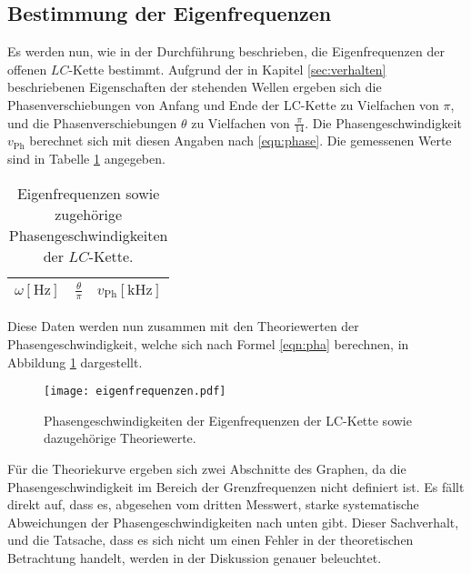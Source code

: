\subsection{Bestimmung der Eigenfrequenzen}
Es werden nun, wie in der Durchführung beschrieben, die Eigenfrequenzen der offenen $LC$-Kette bestimmt.
Aufgrund der in Kapitel \ref{sec:verhalten} beschriebenen Eigenschaften der stehenden Wellen ergeben sich die Phasenverschiebungen von Anfang und Ende der LC-Kette zu Vielfachen von $\pi$, und die Phasenverschiebungen $\theta$ zu Vielfachen von $\frac{\pi}{14}$.
Die Phasengeschwindigkeit $v_{\text{Ph}}$ berechnet sich mit diesen Angaben nach \eqref{eqn:phase}.
Die gemessenen Werte sind in Tabelle \ref{tab:eigenfrequenzen} angegeben.
\begin{table}
  \centering
  \caption{Eigenfrequenzen sowie zugehörige Phasengeschwindigkeiten der $LC$-Kette.}
  \label{tab:eigenfrequenzen}
  \begin{tabular}{c c c}
    \toprule
    {$\omega [\si{\hertz}]$} & {$\frac{\theta}{\pi} $} & {$v_{\text{Ph}} [\si{\kilo\hertz}] $}\\
    \midrule
    
    \bottomrule
  \end{tabular}
\end{table}
Diese Daten werden nun zusammen mit den Theoriewerten der Phasengeschwindigkeit, welche sich nach Formel \eqref{eqn:pha} berechnen, in Abbildung \ref{fig:phasengeschwindigkeiten} dargestellt.
\begin{figure}[H]
  \centering
  \texttt{[image: eigenfrequenzen.pdf]}
  \caption{Phasengeschwindigkeiten der Eigenfrequenzen der LC-Kette sowie dazugehörige Theoriewerte.}
  \label{fig:phasengeschwindigkeiten}
\end{figure}
Für die Theoriekurve ergeben sich zwei Abschnitte des Graphen, da die Phasengeschwindigkeit im Bereich der Grenzfrequenzen nicht definiert ist.
Es fällt direkt auf, dass es, abgesehen vom dritten Messwert, starke systematische Abweichungen der Phasengeschwindigkeiten nach unten gibt.
Dieser Sachverhalt, und die Tatsache, dass es sich nicht um einen Fehler in der theoretischen Betrachtung handelt, werden in der Diskussion genauer beleuchtet.

